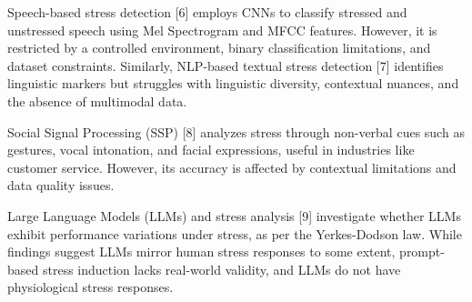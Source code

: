\documentclass[a4j, twocolumn]{article}
\begin{document}
Speech-based stress detection [6] employs CNNs to classify stressed and unstressed speech using Mel Spectrogram and MFCC features. However, it is restricted by a controlled environment, binary classification limitations, and dataset constraints. Similarly, NLP-based textual stress detection [7] identifies linguistic markers but struggles with linguistic diversity, contextual nuances, and the absence of multimodal data.

Social Signal Processing (SSP) [8] analyzes stress through non-verbal cues such as gestures, vocal intonation, and facial expressions, useful in industries like customer service. However, its accuracy is affected by contextual limitations and data quality issues.

Large Language Models (LLMs) and stress analysis [9] investigate whether LLMs exhibit performance variations under stress, as per the Yerkes-Dodson law. While findings suggest LLMs mirror human stress responses to some extent, prompt-based stress induction lacks real-world validity, and LLMs do not have physiological stress responses.
\end{document}
